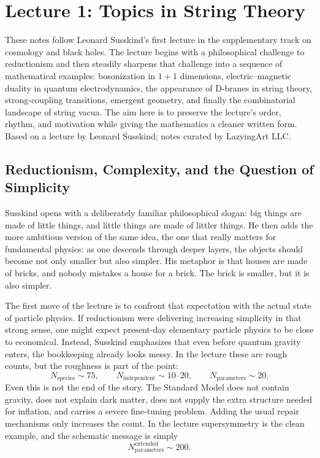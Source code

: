 \chapter{Lecture 1: Topics in String Theory}

These notes follow Leonard Susskind's first lecture in the supplementary track on cosmology and black holes. The lecture begins with a philosophical challenge to reductionism and then steadily sharpens that challenge into a sequence of mathematical examples: bosonization in \(1+1\) dimensions, electric--magnetic duality in quantum electrodynamics, the appearance of D-branes in string theory, strong-coupling transitions, emergent geometry, and finally the combinatorial landscape of string vacua. The aim here is to preserve the lecture's order, rhythm, and motivation while giving the mathematics a cleaner written form. Based on a lecture by Leonard Susskind; notes curated by LazyingArt LLC.

\section{Reductionism, Complexity, and the Question of Simplicity}

Susskind opens with a deliberately familiar philosophical slogan: big things are made of little things, and little things are made of littler things. He then adds the more ambitious version of the same idea, the one that really matters for fundamental physics: as one descends through deeper layers, the objects should become not only smaller but also simpler. His metaphor is that houses are made of bricks, and nobody mistakes a house for a brick. The brick is smaller, but it is also simpler.

The first move of the lecture is to confront that expectation with the actual state of particle physics. If reductionism were delivering increasing simplicity in that strong sense, one might expect present-day elementary particle physics to be close to economical. Instead, Susskind emphasizes that even before quantum gravity enters, the bookkeeping already looks messy. In the lecture these are rough counts, but the roughness is part of the point:
\begin{equation}
N_{\mathrm{species}} \sim 75,
\qquad
N_{\mathrm{independent}} \sim 10\text{--}20,
\qquad
N_{\mathrm{parameters}} \sim 20.
\end{equation}
Even this is not the end of the story. The Standard Model does not contain gravity, does not explain dark matter, does not supply the extra structure needed for inflation, and carries a severe fine-tuning problem. Adding the usual repair mechanisms only increases the count. In the lecture supersymmetry is the clean example, and the schematic message is simply
\begin{equation}
N_{\mathrm{parameters}}^{\mathrm{extended}} \sim 200.
\end{equation}

